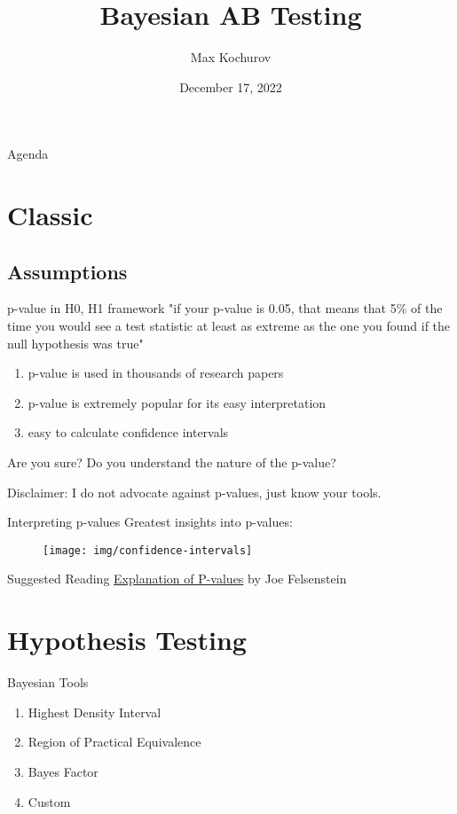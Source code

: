 \documentclass{beamer}
\author{Max Kochurov}
\title[Bayesian AB Testing]{Bayesian AB Testing}
\institute[PyMC Labs - pymc-labs.io]{PyMC Labs}
\date{December 17, 2022}
\begin{document}
\begin{frame}
	\maketitle
\end{frame}
\begin{frame}{Agenda}
\tableofcontents
\end{frame}
\section{Classic}
\subsection{Assumptions}
\begin{frame}{p-value in H0, H1 framework}
"if your p-value is 0.05, that means that 5\% of the time you would see a test statistic at least as extreme as the one you found if the null hypothesis was true"

    \begin{enumerate}
        \item p-value is used in thousands of research papers
        \item p-value is extremely popular for its easy interpretation
        \item easy to calculate confidence intervals
    \end{enumerate}
    \pause
    \begin{alertblock}{Are you sure?}
    Do you understand the nature of the p-value?
    \end{alertblock}
    Disclaimer: I do not advocate against p-values, just know your tools.
\end{frame}
\begin{frame}{Interpreting p-values}
Greatest insights into p-values:
\begin{figure}
    \centering
    \texttt{[image: img/confidence-intervals]}
\end{figure}
\begin{block}{Suggested Reading}
\href{https://evolution.gs.washington.edu/gs560/2011/lecture3.pdf}{Explanation of P-values} by Joe Felsenstein
\end{block}
\end{frame}
\section{Hypothesis Testing}
\begin{frame}{Bayesian Tools}
    \begin{enumerate}
        \item Highest Density Interval
        \item Region of Practical Equivalence
        \item Bayes Factor
        \item Custom
    \end{enumerate}
\end{frame}
\end{document}
